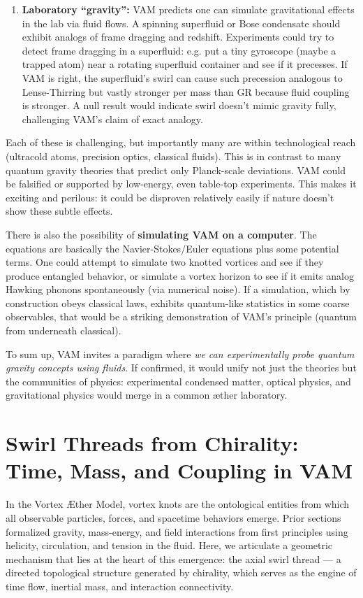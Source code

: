 \documentclass[a4paper,12pt]{article}
\begin{document}
\begin{enumerate}
        \item \textbf{Laboratory “gravity”:}
        VAM predicts one can simulate gravitational effects in the lab via fluid flows. A spinning superfluid or Bose condensate should exhibit analogs of frame dragging and redshift. Experiments could try to detect frame dragging in a superfluid: e.g. put a tiny gyroscope (maybe a trapped atom) near a rotating superfluid container and see if it precesses. If VAM is right, the superfluid’s swirl can cause such precession analogous to Lense-Thirring but vastly stronger per mass than GR because fluid coupling is stronger. A null result would indicate swirl doesn’t mimic gravity fully, challenging VAM’s claim of exact analogy.

    \end{enumerate}

    Each of these is challenging, but importantly many are within technological reach (ultracold atoms, precision optics, classical fluids). This is in contrast to many quantum gravity theories that predict only Planck-scale deviations. VAM could be falsified or supported by low-energy, even table-top experiments. This makes it exciting and perilous: it could be disproven relatively easily if nature doesn’t show these subtle effects.

    There is also the possibility of \textbf{simulating VAM on a computer}. The equations are basically the Navier-Stokes/Euler equations plus some potential terms. One could attempt to simulate two knotted vortices and see if they produce entangled behavior, or simulate a vortex horizon to see if it emits analog Hawking phonons spontaneously (via numerical noise). If a simulation, which by construction obeys classical laws, exhibits quantum-like statistics in some coarse observables, that would be a striking demonstration of VAM’s principle (quantum from underneath classical).

    To sum up, VAM invites a paradigm where \emph{we can experimentally probe quantum gravity concepts using fluids}. If confirmed, it would unify not just the theories but the communities of physics: experimental condensed matter, optical physics, and gravitational physics would merge in a common æther laboratory.

\section{Swirl Threads from Chirality: Time, Mass, and Coupling in VAM}

    In the Vortex Æther Model, vortex knots are the ontological entities from which all observable particles, forces, and spacetime behaviors emerge. Prior sections formalized gravity, mass-energy, and field interactions from first principles using helicity, circulation, and tension in the fluid. Here, we articulate a geometric mechanism that lies at the heart of this emergence: the axial swirl thread — a directed topological structure generated by chirality, which serves as the engine of time flow, inertial mass, and interaction connectivity.
\end{document}
